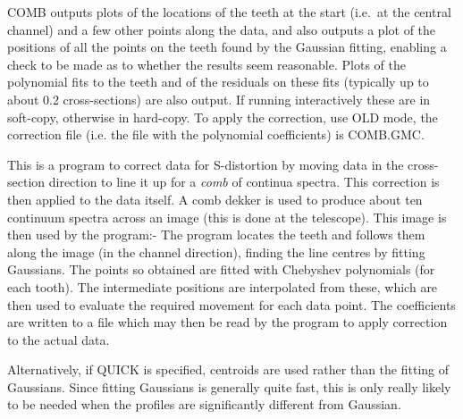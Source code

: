COMB outputs plots of the locations of the teeth at the start (i.e.\ at
the central channel) and a few other points along the data, and also
outputs a plot of the positions of all the points on the teeth found by
the Gaussian fitting, enabling a check to be made as to whether the
results seem reasonable.
Plots of the polynomial fits to the teeth and of the residuals on these
fits (typically up to about 0.2 cross-sections) are also output. If
running interactively these are in soft-copy, otherwise in hard-copy.
To apply the correction, use OLD mode, the correction file (i.e. the
file with the polynomial coefficients) is COMB.GMC.

This is a program to correct data for S-distortion by moving data in
the cross-section direction to line it up for a {\em comb} of continua
spectra. This correction is then applied to the data itself. A comb
dekker is used to produce about ten continuum spectra across an image
(this is done at the telescope). This image is then used by the
program:- The program locates the teeth and follows them along the
image (in the channel direction), finding the line centres by fitting
Gaussians. The points so obtained are fitted with Chebyshev polynomials
(for each tooth). The intermediate positions are interpolated from
these, which are then used to evaluate the required movement for each
data point. The coefficients are written to a file which may then be
read by the program to apply correction to the actual data.

Alternatively, if QUICK is specified, centroids are used rather than
the fitting of Gaussians.
Since fitting Gaussians is generally quite fast, this is only really
likely to be needed when the profiles are significantly different from
Gaussian.

